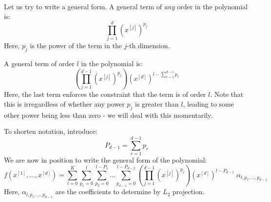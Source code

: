 \documentclass[11pt]{article}
\newcommand{\xdim}[1]{x^{[#1]}}
\begin{document}
\begin{comment}
How many terms are in the polynomial?
\begin{itemize}
\item Of order 0 terms, there is only 1. 
\item Of order 1 terms, there are $d$ terms: $\xdim{1}, \dots, \xdim{d}$. 
\item Of order $2$ terms, there $d$ pure terms $(\xdim{1})^2, \dots, (\xdim[d])^2$, and $\binom{d}{2}$ mixing terms: $(\xdim[1] \xdim[2]), \dots $. This gives a total of $d + \binom{d}{2} = \binom{d}{1} + \binom{d}{2}$ terms.
\item Of order $l \geq 1$ terms, there are $\sum_{p=1}^l \binom{d}{p}$ terms.
\end{itemize}
For a general polynomial then of order $l=0,\dots,K$, we have for the number of terms:
\begin{equation}
M = 1 + \sum_{l=1}^K \sum_{p=1}^l \binom{d}{p}
\end{equation}
\end{comment}

Let us try to write a general form. A general term of \textit{any} order in the polynomial is:
\begin{equation}
\prod_{j=1}^d (\xdim{j})^{p_j}
\end{equation}
Here, $p_j$ is the power of the term in the $j$-th dimension.

A general term of order $l$ in the polynomial is:
\begin{equation}
\left ( \prod_{j=1}^{d-1} (\xdim{j})^{p_j} \right ) (\xdim{d})^{l - \sum_{r=1}^{d-1} p_r}
\end{equation}
Here, the last term enforces the constraint that the term is of order $l$. Note that this is irregardless of whether any power $p_j$ is greater than $l$, leading to some other power being less than zero - we will deal with this momentarily.

To shorten notation, introduce:
\begin{equation}
P_{d-1} = \sum_{r=1}^{d-1} p_r
\end{equation}
We are now in position to write the general form of the polynomial:
\begin{equation}
f(\xdim{1},\dots,\xdim{d}) = \sum_{l=0}^K \sum_{p_1=0}^l \sum_{p_2=0}^{l-P_1} \dots \sum_{p_{d-1}=0}^{l - P_{d-2} } 
\left ( \prod_{j=1}^{d-1} (\xdim{j})^{p_j} \right ) (\xdim{d})^{l - P_{d-1}} 
\;
\alpha_{l,p_1,\dots,p_{d-1}} 
\label{eq:poly}
\end{equation}
Here, $\alpha_{l,p_1,\dots,p_{d-1}}$ are the coefficients to determine by $L_2$ projection.
\end{document}
